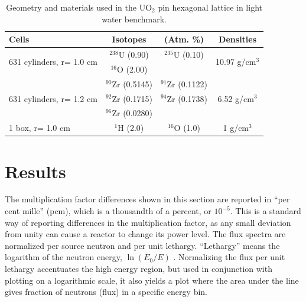 \documentclass[preprint,12pt]{elsarticle}
\begin{document}
\begin{table}[h]
\centering
\caption{Geometry and materials used in the UO$_2$ pin hexagonal lattice in light water benchmark.}
\label{hex_geom}
\begin{tabular}{| l | c  c | c |}
\hline
Cells & Isotopes & (Atm. \%) & Densities \\
\hline
\multirow{2}{*}{631 cylinders, r= 1.0 cm }  &   $^{238}$U   (0.90)   &    $^{235}$U   (0.10)  &  \multirow{2}{*}{10.97 g/cm$^3$} \\
                                           &   $^{16}$O    (2.00)   &                        &  \\
\hline
\multirow{3}{*}{631 cylinders, r= 1.2 cm }  &   $^{90}$Zr   (0.5145) &    $^{91}$Zr   (0.1122)&  \multirow{3}{*}{6.52 g/cm$^3$} \\
                                           &   $^{92}$Zr   (0.1715) &    $^{94}$Zr   (0.1738)& \\
                                           &   $^{96}$Zr   (0.0280) &                        & \\
\hline
\multirow{1}{*}{1 box, r= 1.0 cm }         &   $^{1}$H     (2.0)    &   $^{16}$O  (1.0) & \multirow{1}{*}{1 g/cm$^3$} \\
\hline
\end{tabular}
\end{table}




\newpage
\section{Results}
\label{sec:results}

The multiplication factor differences shown in this section are reported in ``per cent mille'' (pcm), which is a thousandth of a percent, or $10^{-5}$.  This is a standard way of reporting differences in the multiplication factor, as any small deviation from unity can cause a reactor to change its power level.  The flux spectra are normalized per source neutron and per unit lethargy.   ``Lethargy'' means the logarithm of the neutron energy, $\ln(E_0/E)$ \cite{duderstadt}.  Normalizing the flux per unit lethargy accentuates the high energy region, but used in conjunction with plotting on a logarithmic scale, it also yields a plot where the area under the line gives fraction of neutrons (flux) in a specific energy bin.  
\end{document}
